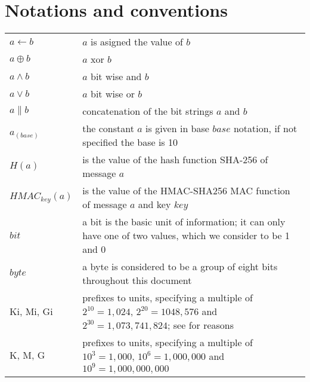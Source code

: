 \section{Notations and conventions}
\begin{tabular}{l|p{8cm}|}
$a \leftarrow b$ & $a$ is asigned the value of $b$\\
$a \oplus b$     & $a$ xor $b$ \\
$a \wedge b$     & $a$ bit wise and $b$ \\
$a \vee b$       & $a$ bit wise or $b$ \\
$a \parallel b$  & concatenation of the bit strings $a$ and $b$ \\
$a_{(base)}$     & the constant $a$ is given in base $base$ notation, if not specified the base is 10\\
$H(a)$           & is the value of the hash function SHA-256 of message $a$ \\
$HMAC_{key}(a)$  & is the value of the HMAC-SHA256 MAC function of message $a$ and key $key$ \\
$bit$            & a bit is the basic unit of information; it can only have one of two values, which we consider to be 1 and 0 \\
$byte$           & a byte is considered to be a group of eight bits throughout this document \\
Ki, Mi, Gi       & prefixes to units, specifying a multiple of $2^{10} = 1,024$, $2^{20} = 1048,576$ and $2^{30} = 1,073,741,824$; see \cite{IEC60027-2} for reasons \\
K, M, G          & prefixes to units, specifying a multiple of $10^3 = 1,000$, $10^6 = 1,000,000$ and $10^9=1,000,000,000$ \\ 
\end{tabular}
